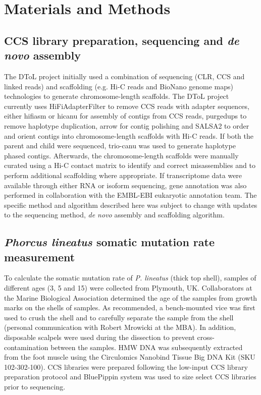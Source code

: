 \section{Materials and Methods}

\subsection{CCS library preparation, sequencing and \textit{de novo} assembly}

The DToL project initially used a combination of sequencing (CLR, CCS and linked reads) and scaffolding (e.g. Hi-C reads and BioNano genome maps) technologies to generate chromosome-length scaffolds. The DToL project currently uses HiFiAdapterFilter \cite{Sim2022-pi} to remove CCS reads with adapter sequences, either hifiasm \cite{Cheng2021-ij} or hicanu \cite{Nurk2020-gu} for  assembly of contigs from CCS reads, purgedups \cite{Guan2020-tl} to remove haplotype duplication, arrow \cite{Chin2016-at} for contig polishing and SALSA2 \cite{Ghurye2019-ua} to order and orient contigs into chromosome-length scaffolds with Hi-C reads. If both the parent and child were sequenced, trio-canu \cite{Koren2018-wg} was used to generate haplotype phased contigs. Afterwards, the chromosome-length scaffolds were manually curated using a Hi-C contact matrix to identify and correct misassemblies and to perform additional scaffolding where appropriate. If transcriptome data were available through either RNA or isoform sequencing, gene annotation was also performed in collaboration with the EMBL-EBI eukaryotic annotation team. The specific method and algorithm described here was subject to change with updates to the sequencing method, \textit{de novo} assembly and scaffolding algorithm. 

\subsection{\textit{Phorcus lineatus} somatic mutation rate measurement}

To calculate the somatic mutation rate of \textit{P. lineatus} (thick top shell), samples of different ages (3, 5 and 15) were collected from Plymouth, UK. Collaborators at the Marine Biological Association determined the age of the samples from growth marks on the shells of samples. As recommended, a bench-mounted vice was first used to crush the shell and to carefully separate the sample from the shell (personal communication with Robert Mrowicki at the MBA). In addition, disposable scalpels were used during the dissection to prevent cross-contamination between the samples. HMW DNA was subsequently extracted from the foot muscle using the Circulomics Nanobind Tissue Big DNA Kit (SKU 102-302-100). CCS libraries were prepared following the low-input CCS library preparation protocol and BluePippin system was used to size select CCS libraries prior to sequencing.

